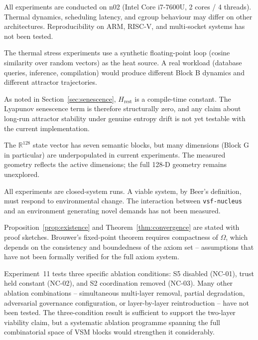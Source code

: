 \documentclass[11pt, a4paper]{article}
\newcommand{\R}{\mathbb{R}}
\newcommand{\nucleus}{\texttt{vsf-nucleus}}
\begin{document}
\begin{description}[itemsep=0.55em]

  \item[Single hardware node]
    All experiments are conducted on n02 (Intel Core i7-7600U, 2 cores / 4 threads).
    Thermal dynamics, scheduling latency, and cgroup behaviour may differ
    on other architectures.
    Reproducibility on ARM, RISC-V, and multi-socket systems has not been tested.

  \item[Synthetic workload]
    The thermal stress experiments use a synthetic floating-point loop
    (cosine similarity over random vectors) as the heat source.
    A real workload (database queries, inference, compilation) would
    produce different Block B dynamics and different attractor trajectories.

  \item[Constant entropy ceiling]
    As noted in Section~\ref{sec:senescence}, $H_\text{rest}$ is a
    compile-time constant.
    The Lyapunov senescence term is therefore structurally zero, and any
    claim about long-run attractor stability under genuine entropy drift
    is not yet testable with the current implementation.

  \item[State vector dimensionality]
    The $\R^{128}$ state vector has seven semantic blocks, but many
    dimensions (Block G in particular) are underpopulated in current
    experiments.
    The measured geometry reflects the active dimensions; the full 128-D
    geometry remains unexplored.

  \item[No external environment]
    All experiments are closed-system runs.
    A viable system, by Beer's definition, must respond to environmental
    change.
    The interaction between \nucleus{} and an environment generating
    novel demands has not been measured.

  \item[Proof sketch, not full proof]
    Proposition~\ref{prop:existence} and Theorem~\ref{thm:convergence}
    are stated with proof sketches.
    Brouwer's fixed-point theorem requires compactness of $\Omega$, which
    depends on the consistency and boundedness of the axiom set -- assumptions
    that have not been formally verified for the full axiom system.

  \item[Architecture ablation scope]
    Experiment~11 tests three specific ablation conditions: S5 disabled
    (NC-01), trust held constant (NC-02), and S2 coordination removed (NC-03).
    Many other ablation combinations -- simultaneous multi-layer removal,
    partial degradation, adversarial governance configuration, or
    layer-by-layer reintroduction -- have not been tested.
    The three-condition result is sufficient to support the two-layer
    viability claim, but a systematic ablation programme spanning the
    full combinatorial space of VSM blocks would strengthen it
    considerably.


\end{description}
\end{document}
